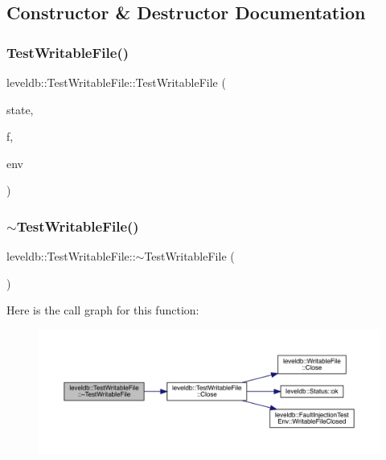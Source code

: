 \subsection{Constructor \& Destructor Documentation}
\mbox{\label{classleveldb_1_1_test_writable_file_aa7ca9d0df5ec92b331de04f0946bff4e}} 
\subsubsection{\texorpdfstring{TestWritableFile()}{TestWritableFile()}}
{\footnotesize\ttfamily leveldb\+::\+Test\+Writable\+File\+::\+Test\+Writable\+File (\begin{DoxyParamCaption}\item[{const File\+State \&}]{state,  }\item[{\mbox{\hyperlink{classleveldb_1_1_writable_file}{Writable\+File}} $\ast$}]{f,  }\item[{\mbox{\hyperlink{classleveldb_1_1_fault_injection_test_env}{Fault\+Injection\+Test\+Env}} $\ast$}]{env }\end{DoxyParamCaption})}

\mbox{\label{classleveldb_1_1_test_writable_file_addaa3999b5a79da29cbaefb30ee48c11}} 
\subsubsection{\texorpdfstring{$\sim$TestWritableFile()}{~TestWritableFile()}}
{\footnotesize\ttfamily leveldb\+::\+Test\+Writable\+File\+::$\sim$\+Test\+Writable\+File (\begin{DoxyParamCaption}{ }\end{DoxyParamCaption})\hspace{0.3cm}{\ttfamily [virtual]}}

Here is the call graph for this function\+:
\nopagebreak
\begin{figure}[H]
\begin{center}
\leavevmode
\includegraphics[width=350pt]{classleveldb_1_1_test_writable_file_addaa3999b5a79da29cbaefb30ee48c11_cgraph}
\end{center}
\end{figure}


